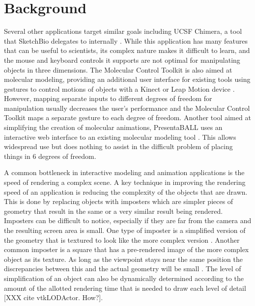 \documentclass{article} %
\begin{document}
\section{Background}
Several other applications target similar goals including UCSF Chimera, a tool that SketchBio delegates to internally \cite{pettersen2004ucsf}.  While this application has many features that can be useful to scientists, its complex nature makes it difficult to learn, and the mouse and keyboard controls it supports are not optimal for manipulating objects in three dimensions.  The Molecular Control Toolkit is also aimed at molecular modeling, providing an additional user interface for existing tools using gestures to control motions of objects with a Kinect or Leap Motion device \cite{sabirmolecular}.  However, mapping separate inputs to different degrees of freedom for manipulation usually decreases the user's performance\cite{bowman20043d} and the Molecular Control Toolkit maps a separate gesture to each degree of freedom.  Another tool aimed at simplifying the creation of molecular animations, PresentaBALL uses an interactive web interface to an existing molecular modeling tool \cite{nickelspresentaball}.  This allows widespread use but does nothing to assist in the difficult problem of placing things in 6 degrees of freedom.

A common bottleneck in interactive modeling and animation applications is the speed of rendering a complex scene.  A key technique in improving the rendering speed of an application is reducing the complexity of the objects that are drawn.  This is done by replacing objects with imposters which are simpler pieces of geometry that result in the same or a very similar result being rendered.  Imposters can be difficult to notice, especially if they are far from the camera and the resulting screen area is small.  One type of imposter is a simplified version of the geometry that is textured to look like the more complex version \cite{decoret2003billboard}\cite{erikson1998simplification}\cite{cohen1998appearance}.  Another common imposter is a square that has a pre-rendered image of the more complex object as its texture.  As long as the viewpoint stays near the same position the discrepancies between this and the actual geometry will be small \cite{aliaga1996visualization}\cite{maciel1995visual}.  The level of simplification of an object can also be dynamically determined according to the amount of the allotted rendering time that is needed to draw each level of detail [XXX cite vtkLODActor.  How?].
\end{document}

